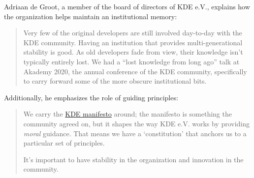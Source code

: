 \begin{kaobox}[frametitle=The role of KDE e.V. in maintaining institutional memory for the KDE community]

Adriaan de Groot, a member of the board of directors of KDE e.V., explains how the organization helps maintain an institutional memory:

\begin{quote}

Very few of the original developers are still involved day-to-day with the KDE community.  Having an institution that provides multi-generational stability is good.  As old developers fade from view, their knowledge isn't typically entirely lost.  We had a ``lost knowledge from long ago'' talk at Akademy 2020, the annual conference of the KDE community, specifically to carry forward some of the more obscure institutional bits.

\end{quote}

Additionally, he emphasizes the role of guiding principles:

\begin{quote}

We carry the \href{https://manifesto.kde.org/}{KDE manifesto} around; the manifesto is something the community agreed on, but it shapes the way KDE e.V. works by providing \textit{moral} guidance.  That means we have a `constitution' that anchors us to a particular
set of principles.

It's important to have stability in the organization and innovation in the community.

\end{quote}

\end{kaobox}

